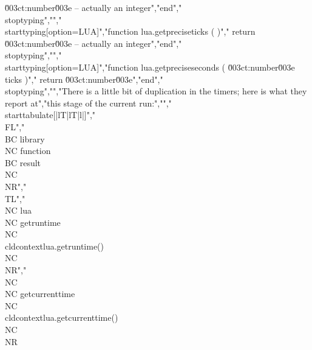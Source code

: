 \u003ct:number\u003e -- actually an integer","end","\\stoptyping","","\\starttyping[option=LUA]","function lua.getpreciseticks ( )","    return \u003ct:number\u003e -- actually an integer","end","\\stoptyping","","\\starttyping[option=LUA]","function lua.getpreciseseconds ( \u003ct:number\u003e ticks )","    return \u003ct:number\u003e","end","\\stoptyping","","There is a little bit of duplication in the timers; here is what they report at","this stage of the current run:","","\\starttabulate[|lT|lT|l|]","    \\FL","    \\BC library \\NC function              \\BC result                               \\NC \\NR","    \\TL","    \\NC lua     \\NC getruntime        \\NC \\cldcontext{lua.getruntime()}        \\NC \\NR","    \\NC         \\NC getcurrenttime    \\NC \\cldcontext{lua.getcurrenttime()}    \\NC \\NR %